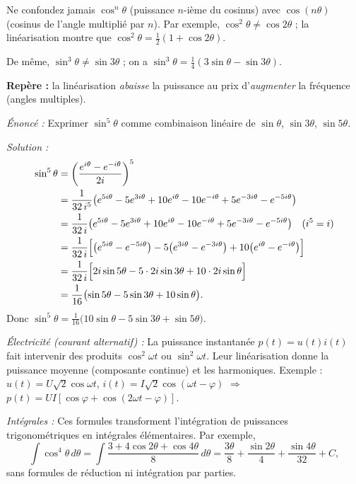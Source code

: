 \documentclass[11pt]{article}
\begin{document}
\begin{attention}
Ne confondez jamais $\cos^n\theta$ (puissance $n$-ième du cosinus) avec $\cos(n\theta)$ (cosinus de l'angle multiplié par $n$). Par exemple, $\cos^2\theta\ne\cos2\theta$ ; la linéarisation montre que $\cos^2\theta=\frac12(1+\cos2\theta)$.
\par De même, $\sin^3\theta \ne \sin3\theta$ ; on a $\sin^3\theta = \frac14(3\sin\theta-\sin3\theta)$.
\par \textbf{Repère :} la linéarisation \emph{abaisse} la puissance au prix d'\emph{augmenter} la fréquence (angles multiples).
\end{attention}

\begin{exoresolu}
\emph{Énoncé :} Exprimer $\sin^5\theta$ comme combinaison linéaire de $\sin\theta$, $\sin3\theta$, $\sin5\theta$.
\par\emph{Solution :}
\begin{align*}
\sin^5\theta &= \left(\frac{e^{i\theta}-e^{-i\theta}}{2i}\right)^5 \\
&= \frac{1}{32\,i^5}\bigl(e^{5i\theta}-5e^{3i\theta}+10e^{i\theta}-10e^{-i\theta}+5e^{-3i\theta}-e^{-5i\theta}\bigr) \\
&= \frac{1}{32\,i}\bigl(e^{5i\theta}-5e^{3i\theta}+10e^{i\theta}-10e^{-i\theta}+5e^{-3i\theta}-e^{-5i\theta}\bigr) \quad(i^5=i) \\
&= \frac{1}{32\,i}\Bigl[\bigl(e^{5i\theta}-e^{-5i\theta}\bigr)-5\bigl(e^{3i\theta}-e^{-3i\theta}\bigr)+10\bigl(e^{i\theta}-e^{-i\theta}\bigr)\Bigr] \\
&= \frac{1}{32\,i}\Bigl[2i\sin5\theta -5\cdot2i\sin3\theta +10\cdot2i\sin\theta\Bigr] \\
&= \frac{1}{16}\bigl(\sin5\theta-5\sin3\theta+10\sin\theta\bigr).
\end{align*}
Donc $\displaystyle\sin^5\theta = \frac{1}{16}\bigl(10\sin\theta-5\sin3\theta+\sin5\theta\bigr)$.
\end{exoresolu}

\begin{savaistu}
\emph{Électricité (courant alternatif) :} La puissance instantanée $p(t)=u(t)i(t)$ fait intervenir des produits $\cos^2\omega t$ ou $\sin^2\omega t$. Leur linéarisation donne la puissance moyenne (composante continue) et les harmoniques. Exemple : $u(t)=U\sqrt2\cos\omega t$, $i(t)=I\sqrt2\cos(\omega t-\varphi)$ $\Rightarrow$ $p(t)=UI[\cos\varphi+\cos(2\omega t-\varphi)]$.
\par\emph{Intégrales :} Ces formules transforment l'intégration de puissances trigonométriques en intégrales élémentaires. Par exemple,
\[
\int\cos^4\theta\,d\theta = \int\frac{3+4\cos2\theta+\cos4\theta}{8}\,d\theta
= \frac{3\theta}{8}+\frac{\sin2\theta}{4}+\frac{\sin4\theta}{32}+C,
\]
sans formules de réduction ni intégration par parties.
\end{savaistu}
\end{document}
